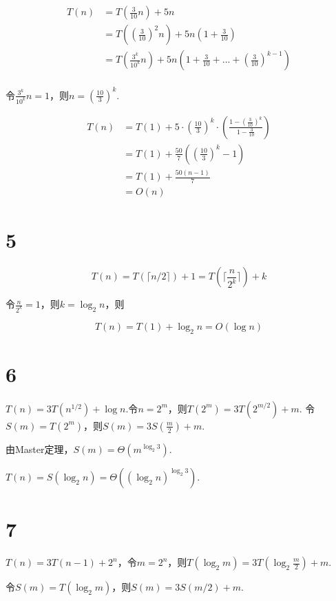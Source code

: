 \documentclass{ctexart}
\begin{document}
$$
\begin{aligned}
T(n)&=T\left(\frac{3}{10}n\right)+5n\\
&=T\left( \left(\frac{3}{10}\right)^2 n  \right) + 5n\left(1+\frac{3}{10}\right)\\
&=T\left( \frac{3^k}{10^k} n \right) +5n \left( 1+\frac{3}{10}+...+\left(  \frac{3}{10} \right)^{k-1} \right)\\
\end{aligned}
$$

令$\frac{3^k}{10^k} n =1$，则$n=\left( \frac{10}{3} \right)^k$.

$$
\begin{aligned}
T(n) &= T(1)+5\cdot \left( \frac{10}{3} \right)^k \cdot \left(  \frac{1-\left(\frac{3}{10}\right)^k}{1-\frac{3}{10}} \right)  \\
&= T(1)+ \frac{50}{7} \left( \left( \frac{10}{3}\right) ^k -1 \right)\\
&=T(1) + \frac{50(n-1)}{7}\\
&=O(n)
\end{aligned}
$$


\section*{5}

$$
T(n)=T(\lceil n/2 \rceil )+1 = T(\lceil \frac{n}{2^k} \rceil )+k
$$

令$\frac{n}{2^k}=1$，则$k=\log _2 n$，则

$$
T(n)=T(1)+ \log_2 n = O(\log n)
$$


\section*{6}

$T(n)=3T(n^{1/2})+ \log n$.令$n=2^m$，则$T(2^m) = 3T(2^{m/2})+m$.
令$S(m)=T(2^m)$，则$S(m)=3S(\frac{m}{2})+m$.

由Master定理，$S(m) = \Theta(m^{\log_2 3})$.

$T(n) = S(\log_2 n) = \Theta\left( (\log_2 n)^{\log _2 3}  \right)$.


\section*{7}

$T(n) = 3T(n-1)+2^n$，令$m=2^n$，则$T(\log_2 m) = 3T(\log_2 \frac{m}{2}) + m$.

令$S(m) = T(\log_2 m)$，则$S(m) = 3S(m/2) + m$.
\end{document}
